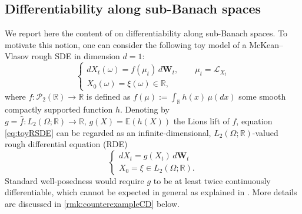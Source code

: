 \documentclass[10pt, a4paper]{article} %
\newcommand{\R}{\mathbb{R}}
\newcommand{\E}{\mathbb{E}}
\theoremstyle{definition}
\theoremstyle{plain}
\begin{document}
    


\subsection{Differentiability along sub-Banach spaces}
We report here the content of \cite[Section 2.2]{FHL25} on differentiability along sub-Banach spaces. 
{To motivate this notion, one can consider the following toy model of a McKean--Vlasov rough SDE in dimension $d=1$:
        \begin{equation} \label{eq:toyRSDE}
        \begin{cases}
            d X_t(\omega) = f(\mu_t) \, d\mathbf{W}_t, \qquad
            \mu_t = \mathcal{L}_{X_t} \\
            X_0(\omega) = \xi(\omega) \in \R ,
        \end{cases}
        \end{equation}
    where $f:\mathcal{P}_2(\R) \to \R$ is defined as $f(\mu) := \int_{\R} h(x) \, \mu(dx)$ some smooth compactly supported function $h$. 
    Denoting by $g=\hat f:L_2(\Omega;\R) \to \R, \, g(X) = \E(h(X))$ the Lions lift of $f$, equation \eqref{eq:toyRSDE} can be regarded as an infinite-dimensional, $L_2(\Omega;\R)$-valued rough differential equation (RDE) 
    \begin{equation*} 
        \begin{cases}
            d X_t = g(X_t) \, d\mathbf{W}_t \\
            X_0 = \xi \in L_2(\Omega;\R) .
        \end{cases}
        \end{equation*}
    Standard well-posedness would require $g$ to be at least twice continuously differentiable, which cannot be expected in general as explained in \cite[Remark 5.80]{CARMONADELARUE_volumeI}. 
    More details are discussed in \cref{rmk:counterexampleCD} below. 
}
\end{document}
